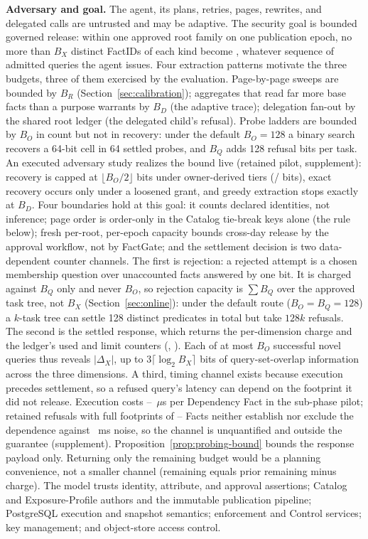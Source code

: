 \documentclass[10pt,journal,compsoc]{IEEEtran}
\newcommand{\system}{FactGate\xspace}
\newcommand{\code}[1]{\texttt{\detokenize{#1}}}
\begin{document}
\textbf{Adversary and goal.} The agent, its plans, retries, pages, rewrites,
and delegated calls are untrusted and may be adaptive. The security goal is
bounded governed release: within one approved root family on one publication
epoch, no more than $B_X$ distinct FactIDs of each kind become
\code{AVAILABLE}, whatever sequence of admitted queries the agent issues.
Four extraction patterns motivate the three budgets, three of them
exercised by the evaluation. Page-by-page sweeps are bounded by $B_R$
(Section~\ref{sec:calibration}); aggregates that read far more base facts
than a purpose warrants by $B_D$ (the adaptive trace); delegation fan-out
by the shared root ledger (the delegated child's refusal). Probe ladders
are bounded by $B_O$ in count but not in recovery: under the default
$B_O=128$ a binary search recovers a 64-bit cell in 64 settled probes, and
$B_Q$ adds 128 refusal bits per task. An executed adversary study realizes
the bound live (retained pilot, supplement): recovery is capped at
$\lfloor B_O/2\rfloor$ bits under owner-derived tiers
(\FinalVFiveAdversaryOwnerBits{}/\FinalVFiveAdversaryTightenedBits{}
bits), exact recovery occurs only under a loosened grant, and greedy
extraction stops exactly at $B_D$. Four
boundaries hold at this goal: it counts declared identities, not inference;
page order is order-only in the Catalog tie-break keys alone (the
\code{ORDER BY} rule below); fresh per-root, per-epoch capacity bounds
cross-day release by the approval workflow, not by \system; and the settlement
decision is two data-dependent counter channels. The first is rejection: a
rejected attempt is a chosen membership question over unaccounted facts
answered by one bit. It is charged against $B_Q$
only and never $B_O$, so rejection capacity is $\sum B_Q$ over the approved
task tree, not $B_X$ (Section~\ref{sec:online}): under the default route
($B_O{=}B_Q{=}128$) a $k$-task tree can settle 128 distinct predicates in
total but take $128k$ refusals. The second is the settled response, which
returns the per-dimension charge and the ledger's used and limit counters
(\code{exposure}, \code{exposure_budget}). Each of at most $B_O$
successful novel queries thus reveals $|\Delta_X|$, up to $3\lceil\log_2
B_X\rceil$ bits of query-set-overlap information across the three
dimensions. A third, timing channel exists because execution precedes
settlement, so a refused query's latency can depend on the footprint it did
not release. Execution costs \FinalVFiveSubphaseMicrosPerFactSTwoSFTen{}--\FinalVFiveSubphaseMicrosPerFactSSixHundredKByteSixteen{}~$\mu$s
per Dependency Fact in the sub-phase pilot; retained refusals with full
footprints of \TimingFullMin{}--\TimingFullMax{} Facts neither establish nor
exclude the dependence against \TimingPooledSDMS{}~ms noise, so the channel
is unquantified and outside the guarantee (supplement).
Proposition~\ref{prop:probing-bound} bounds the response payload only.
Returning only the
remaining budget would be a planning convenience, not a smaller channel
(remaining equals prior remaining minus charge). The model
trusts identity, attribute, and approval assertions; Catalog and
Exposure-Profile authors and the immutable publication pipeline; PostgreSQL
execution and snapshot semantics; enforcement and Control services; key
management; and object-store access control.
\end{document}

